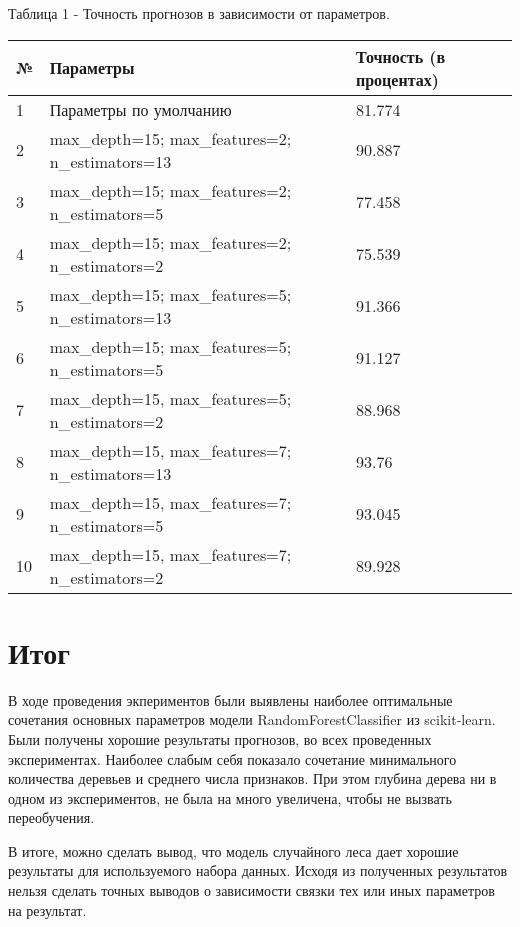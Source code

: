 \documentclass[a4paper,12pt]{article}
\begin{document}
	\vspace{0.5cm}
	Таблица 1 - Точность прогнозов в зависимости от параметров.
\begin{longtable}{|p{1cm}|p{9cm}|p{3cm}|}
\hline
№ & Параметры & Точность (в процентах) \\ 
\hline 
1 & Параметры по умолчанию & 81.774 \\
\hline
2 & max\_depth=15; max\_features=2; n\_estimators=13 & 90.887 \\
\hline 
3 & max\_depth=15; max\_features=2; n\_estimators=5 & 77.458 \\
\hline 
4 & max\_depth=15; max\_features=2; n\_estimators=2 & 75.539 \\
\hline 
5 & max\_depth=15; max\_features=5; n\_estimators=13 & 91.366 \\
\hline
6 & max\_depth=15; max\_features=5; n\_estimators=5 & 91.127 \\
\hline  
7 & max\_depth=15, max\_features=5; n\_estimators=2 & 88.968 \\
\hline
8 & max\_depth=15, max\_features=7; n\_estimators=13 & 93.76\\
\hline 
9 & max\_depth=15, max\_features=7; n\_estimators=5 & 93.045 \\
\hline
10 & max\_depth=15, max\_features=7; n\_estimators=2 & 89.928 \\
\hline
\end{longtable}


\newpage\section{Итог}
	В ходе проведения экпериментов были выявлены наиболее оптимальные сочетания основных параметров модели RandomForestClassifier из scikit-learn. Были получены хорошие результаты прогнозов, во всех проведенных экспериментах. Наиболее слабым себя показало сочетание минимального количества деревьев и среднего числа признаков. При этом глубина дерева ни в одном из экспериментов, не была на много увеличена, чтобы не вызвать переобучения. 
	
	\vspace{0.5cm}
	В итоге, можно сделать вывод, что модель случайного леса дает хорошие результаты для используемого набора данных. Исходя из полученных результатов нельзя сделать точных выводов о зависимости связки тех или иных параметров на результат.
	
	
\end{document}
